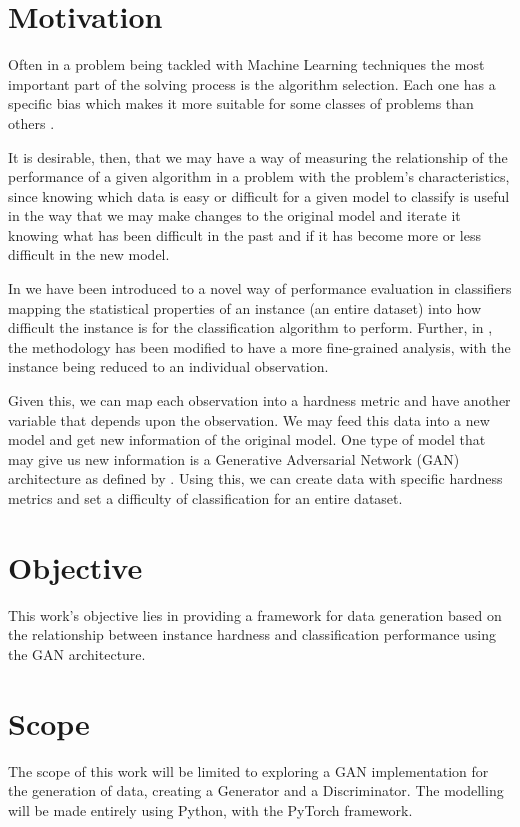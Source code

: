 \section{Motivation}
Often in a problem being tackled with Machine Learning techniques the most important part of the solving process is the algorithm selection. Each one has a specific bias which makes it more suitable for some classes of problems than others \cite{Lorena2022}. 

It is desirable, then, that we may have a way of measuring the relationship of the performance of a given algorithm in a problem with the problem's characteristics, since knowing which data is easy or difficult for a given model to classify is useful in the way that we may make changes to the original model and iterate it knowing what has been difficult in the past and if it has become more or less difficult in the new model.

In \cite{Munoz2018} we have been introduced to a novel way of performance evaluation in classifiers mapping the statistical properties of an instance (an entire dataset) into how difficult the instance is for the classification algorithm to perform. Further, in \cite{Lorena2022}, the methodology has been modified to have a more fine-grained analysis, with the instance being reduced to an individual observation.

Given this, we can map each observation into a hardness metric and have another variable that depends upon the observation. We may feed this data into a new model and get new information of the original model. One type of model that may give us new information is a Generative Adversarial Network (GAN) architecture as defined by \cite{Goodfellow2014}. Using this, we can create data with specific hardness metrics and set a difficulty of classification for an entire dataset.

\section{Objective}

This work's objective lies in providing a framework for data generation based on the relationship between instance hardness and classification performance using the GAN architecture. 

\section{Scope}

The scope of this work will be limited to exploring a GAN implementation for the generation of data, creating a Generator and a Discriminator.  The modelling will be made entirely using Python, with the PyTorch \cite{paszke2019pytorch} framework.

